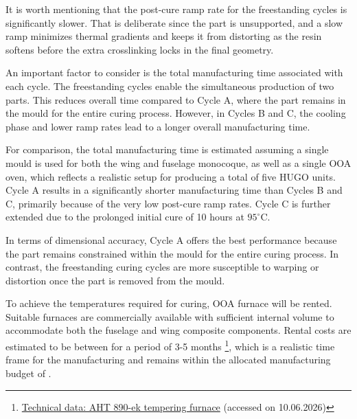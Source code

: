 It is worth mentioning that the post-cure ramp rate for the freestanding cycles is significantly slower. That is deliberate since the part is unsupported, and a slow ramp minimizes thermal gradients and keeps it from distorting as the resin softens before the extra crosslinking locks in the final geometry. 

An important factor to consider is the total manufacturing time associated with each cycle. The freestanding cycles enable the simultaneous production of two parts. This reduces overall time compared to Cycle A, where the part remains in the mould for the entire curing process. However, in Cycles B and C, the cooling phase and lower ramp rates lead to a longer overall manufacturing time.

For comparison, the total manufacturing time is estimated assuming a single mould is used for both the wing and fuselage monocoque, as well as a single OOA oven, which reflects a realistic setup for producing a total of five HUGO units. Cycle A results in a significantly shorter manufacturing time than Cycles B and C, primarily because of the very low post-cure ramp rates. Cycle C is further extended due to the prolonged initial cure of 10 hours at $95^\circ$C. %

In terms of dimensional accuracy, Cycle A offers the best performance because the part remains constrained within the mould for the entire curing process. In contrast, the freestanding curing cycles are more susceptible to warping or distortion once the part is removed from the mould. %


To achieve the temperatures required for curing, OOA furnace will be rented. Suitable furnaces are commercially available with sufficient internal volume to accommodate both the fuselage and wing composite components. Rental costs are estimated to be between   for a period of 3-5 months \footnote{\href{https://www.airtec-gmbh.de/wp-content/uploads/2023/10/Renting-an-industrial-furnace.pdf}{Technical data: AHT 890-ek tempering furnace} (accessed on 10.06.2026)}, which is a realistic time frame for the manufacturing and remains within the allocated manufacturing budget of  .



